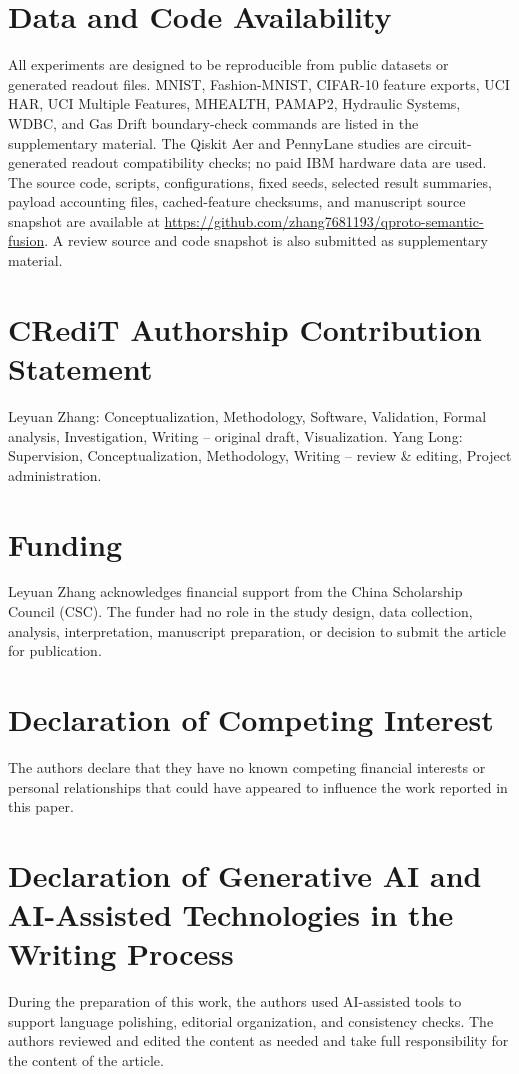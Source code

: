 \documentclass[preprint]{elsarticle}
\begin{document}
\section*{Data and Code Availability}

All experiments are designed to be reproducible from public datasets or generated readout files. MNIST, Fashion-MNIST, CIFAR-10 feature exports, UCI HAR, UCI Multiple Features, MHEALTH, PAMAP2, Hydraulic Systems, WDBC, and Gas Drift boundary-check commands are listed in the supplementary material. The Qiskit Aer and PennyLane studies are circuit-generated readout compatibility checks; no paid IBM hardware data are used. The source code, scripts, configurations, fixed seeds, selected result summaries, payload accounting files, cached-feature checksums, and manuscript source snapshot are available at \url{https://github.com/zhang7681193/qproto-semantic-fusion}. A review source and code snapshot is also submitted as supplementary material.

\section*{CRediT Authorship Contribution Statement}

Leyuan Zhang: Conceptualization, Methodology, Software, Validation, Formal analysis, Investigation, Writing -- original draft, Visualization. Yang Long: Supervision, Conceptualization, Methodology, Writing -- review \& editing, Project administration.

\section*{Funding}

Leyuan Zhang acknowledges financial support from the China Scholarship Council (CSC). The funder had no role in the study design, data collection, analysis, interpretation, manuscript preparation, or decision to submit the article for publication.

\section*{Declaration of Competing Interest}

The authors declare that they have no known competing financial interests or personal relationships that could have appeared to influence the work reported in this paper.

\section*{Declaration of Generative AI and AI-Assisted Technologies in the Writing Process}

During the preparation of this work, the authors used AI-assisted tools to support language polishing, editorial organization, and consistency checks. The authors reviewed and edited the content as needed and take full responsibility for the content of the article.


\FloatBarrier


\end{document}
